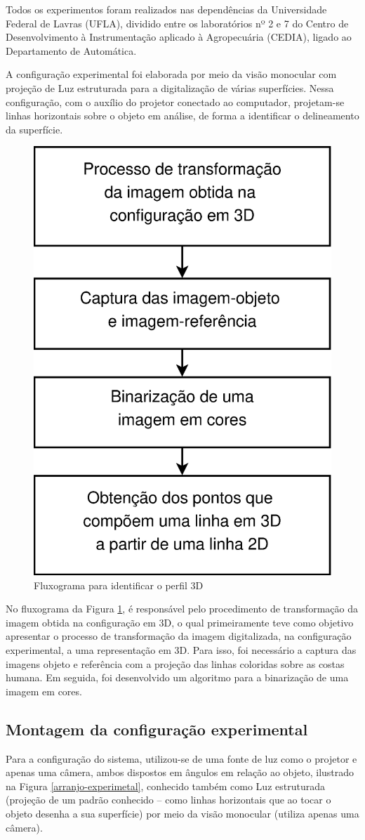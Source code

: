 \documentclass[a4paper, 12pt]{article}
\begin{document}
Todos os experimentos foram realizados nas dependências da Universidade Federal de Lavras (UFLA), 
dividido entre os laboratórios nº 2 e 7 do Centro de Desenvolvimento à Instrumentação aplicado à Agropecuária (CEDIA), 
ligado ao Departamento de Automática.

A configuração experimental foi elaborada por meio da visão monocular \cite{RIBEIRO:2014} com projeção de Luz estruturada para a digitalização de várias superfícies.
Nessa configuração, com o auxílio do projetor conectado ao computador, 
projetam-se linhas horizontais sobre o objeto em análise, de forma a identificar o delineamento da superfície.

\begin{figure}[h!]
	\centering
		\includegraphics[width=.35\linewidth]{fluxograma_identificar_3D.eps}
	\caption{Fluxograma para identificar o perfil 3D}
	\label{fluxograma_identificar_3D}
\end{figure}


No fluxograma da Figura \ref{fluxograma_identificar_3D}, é responsável pelo procedimento de transformação da imagem obtida na configuração em 3D, o qual primeiramente teve como objetivo apresentar o processo de transformação da imagem digitalizada, na configuração experimental, a uma representação em 3D. Para isso, foi necessário a captura das imagens objeto e referência com a projeção das linhas coloridas sobre as costas humana. Em seguida, foi desenvolvido um algoritmo para a binarização de uma imagem em cores.

\subsection{Montagem da configuração experimental}
\label{subsec:montagem}

Para a configuração do sistema, utilizou-se de uma fonte de luz como o projetor e apenas uma câmera, ambos dispostos em ângulos em relação ao objeto, ilustrado na Figura \ref{arranjo-experimetal}, conhecido também como Luz estruturada (projeção de um padrão conhecido – como linhas horizontais que ao tocar o objeto desenha a sua superfície) por meio da visão monocular (utiliza apenas uma câmera).
\end{document}
